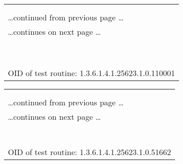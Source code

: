 \documentclass{article}
\begin{document}
\begin{longtable}{|p{}|}
\hline
\rowcolor{openvas_log}{\color{white}{Log (CVSS: 0.0) }}\\
\rowcolor{openvas_log}{\color{white}{NVT: arachni (NASL wrapper)}}\\
\hline
\endfirsthead
\hfill\ldots continued from previous page \ldots \\
\hline
\endhead
\hline
\ldots continues on next page \ldots \\
\endfoot
\hline
\endlastfoot
\\
\rowcolor{white}{\verb=Arachni could not be found in your system path.=}\\
\rowcolor{white}{\verb=OpenVAS was unable to execute Arachni and to perform the scan you=}\\
\rowcolor{white}{\verb=requested.=}\\
\rowcolor{white}{\verb=Please make sure that Arachni is installed and that arachni is=}\\
\rowcolor{white}{\verb=available in the PATH variable defined for your environment.=}\\
\rowcolor{white}{\verb==}\\
\rowcolor{white}{\verb==}\\
\\
OID of test routine: 1.3.6.1.4.1.25623.1.0.110001\\
\end{longtable}

\begin{longtable}{|p{}|}
\hline
\rowcolor{openvas_log}{\color{white}{Log (CVSS: 0.0) }}\\
\rowcolor{openvas_log}{\color{white}{NVT: Traceroute}}\\
\hline
\endfirsthead
\hfill\ldots continued from previous page \ldots \\
\hline
\endhead
\hline
\ldots continues on next page \ldots \\
\endfoot
\hline
\endlastfoot
\\
\rowcolor{white}{\verb=Here is the route from 192.168.248.132 to 192.168.248.131:=}\\
\rowcolor{white}{\verb=192.168.248.132=}\\
\rowcolor{white}{\verb=192.168.248.131=}\\
\rowcolor{white}{\verb==}\\
\rowcolor{white}{\verb==}\\
\\
OID of test routine: 1.3.6.1.4.1.25623.1.0.51662\\
\end{longtable}
\end{document}
